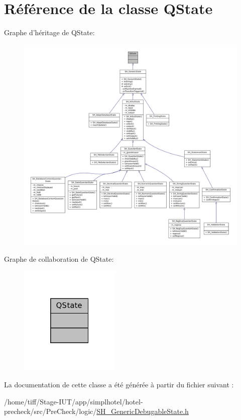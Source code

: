 \hypertarget{classQState}{\section{Référence de la classe Q\-State}
\label{classQState}
}


Graphe d'héritage de Q\-State\-:\nopagebreak
\begin{figure}[H]
\begin{center}
\leavevmode
\includegraphics[width=350pt]{classQState__inherit__graph}
\end{center}
\end{figure}


Graphe de collaboration de Q\-State\-:\nopagebreak
\begin{figure}[H]
\begin{center}
\leavevmode
\includegraphics[width=136pt]{classQState__coll__graph}
\end{center}
\end{figure}


La documentation de cette classe a été générée à partir du fichier suivant \-:\begin{DoxyCompactItemize}
\item 
/home/tiff/\-Stage-\/\-I\-U\-T/app/simplhotel/hotel-\/precheck/src/\-Pre\-Check/logic/\hyperlink{SH__GenericDebugableState_8h}{S\-H\-\_\-\-Generic\-Debugable\-State.\-h}\end{DoxyCompactItemize}

